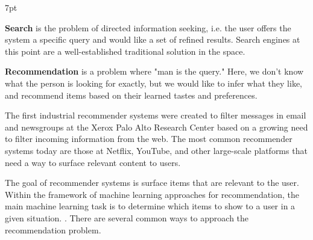 \documentclass[11pt, table]{diazessay} %
\newenvironment{formal}{%
  \def\FrameCommand{%
	\hspace{1pt}%
	{\color{w_lightblue}\vrule width 2pt}%
	{\color{formalshade}\vrule width 4pt}%
	\colorbox{formalshade}%
  }%
  \MakeFramed{\advance\hsize-\width\FrameRestore}%
  \noindent\hspace{-4.55pt}%
  \begin{adjustwidth}{}{7pt}%
  \vspace{2pt}\vspace{2pt}%
}
{%
  \vspace{2pt}\end{adjustwidth}\endMakeFramed%
}
\begin{document}
\begin{sloppypar}
\begin{formal}
\textbf{Search} is the problem of directed \citep{ekstrand2019recommender} information seeking, i.e. the user offers the system a specific query and would like a set of refined results. Search engines at this point are a well-established traditional solution in the space.

\textbf{Recommendation} is a problem where "man is the query." \citep{seaver2022computing}  Here, we don't know what the person is looking for exactly, but we would like to infer what they like, and recommend items based on their learned tastes and preferences.
\end{formal}

The first industrial recommender systems were created to filter messages in email and newsgroups \citep{goldberg1992using}  at the Xerox Palo Alto Research Center based on a growing need to filter incoming information from the web.  The most common recommender systems today are those at Netflix, YouTube, and other large-scale platforms that need a way to surface relevant content to users.

The goal of recommender systems is surface items that are relevant to the user. Within the framework of machine learning approaches for recommendation, the main machine learning task is to determine which items to show to a user in a given situation.  \citep{castells2023recommender}. There are several common ways to approach the recommendation problem.


\end{sloppypar}
\end{document}
